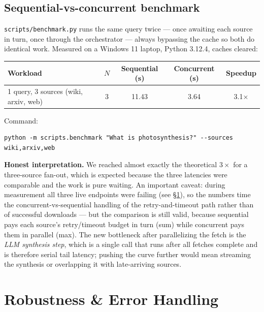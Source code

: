 \documentclass[11pt,a4paper]{article}
\begin{document}
\subsection{Sequential-vs-concurrent benchmark}

\texttt{scripts/benchmark.py} runs the same query twice --- once awaiting each source in turn,
once through the orchestrator --- always bypassing the cache so both do identical work.
Measured on a Windows 11 laptop, Python 3.12.4, caches cleared:

\begin{center}\small
\begin{tabular}{lcccc}
\toprule
\textbf{Workload} & $N$ & \textbf{Sequential (s)} & \textbf{Concurrent (s)} & \textbf{Speedup} \\
\midrule
1 query, 3 sources (wiki, arxiv, web) & 3 & 11.43 & 3.64 & 3.1$\times$ \\
\bottomrule
\end{tabular}
\end{center}

Command:
\begin{lstlisting}[style=plain]
python -m scripts.benchmark "What is photosynthesis?" --sources wiki,arxiv,web
\end{lstlisting}

\textbf{Honest interpretation.} We reached almost exactly the theoretical $3\times$ for a
three-source fan-out, which is expected because the three latencies were comparable and the
work is pure waiting. An important caveat: during measurement all three live endpoints were
failing (see \S\ref{sec:robustness}), so the numbers time the concurrent-vs-sequential
handling of the retry-and-timeout path rather than of successful downloads --- but the
comparison is still valid, because sequential pays each source's retry/timeout budget in turn
(sum) while concurrent pays them in parallel (max). The new bottleneck after parallelizing the
fetch is the \emph{LLM synthesis step}, which is a single call that runs after all fetches
complete and is therefore serial tail latency; pushing the curve further would mean streaming
the synthesis or overlapping it with late-arriving sources.

\section{Robustness \& Error Handling}\label{sec:robustness}
\end{document}
